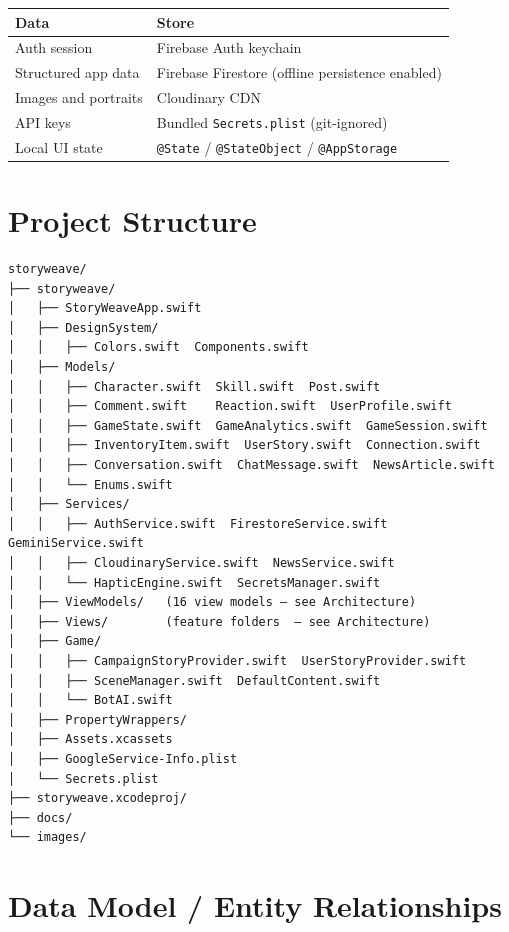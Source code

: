 \documentclass[12pt,a4paper]{article}
\begin{document}
\begin{center}
\begin{tabular}{ll}
  \toprule
  \textbf{Data} & \textbf{Store} \\
  \midrule
  Auth session              & Firebase Auth keychain \\
  Structured app data       & Firebase Firestore (offline persistence enabled) \\
  Images and portraits      & Cloudinary CDN \\
  API keys                  & Bundled \texttt{Secrets.plist} (git-ignored) \\
  Local UI state            & \texttt{@State} / \texttt{@StateObject} / \texttt{@AppStorage} \\
  \bottomrule
\end{tabular}
\end{center}

\section{Project Structure}

{\small
\begin{verbatim}
storyweave/
├── storyweave/
│   ├── StoryWeaveApp.swift
│   ├── DesignSystem/
│   │   ├── Colors.swift  Components.swift
│   ├── Models/
│   │   ├── Character.swift  Skill.swift  Post.swift
│   │   ├── Comment.swift    Reaction.swift  UserProfile.swift
│   │   ├── GameState.swift  GameAnalytics.swift  GameSession.swift
│   │   ├── InventoryItem.swift  UserStory.swift  Connection.swift
│   │   ├── Conversation.swift  ChatMessage.swift  NewsArticle.swift
│   │   └── Enums.swift
│   ├── Services/
│   │   ├── AuthService.swift  FirestoreService.swift  GeminiService.swift
│   │   ├── CloudinaryService.swift  NewsService.swift
│   │   └── HapticEngine.swift  SecretsManager.swift
│   ├── ViewModels/   (16 view models — see Architecture)
│   ├── Views/        (feature folders  — see Architecture)
│   ├── Game/
│   │   ├── CampaignStoryProvider.swift  UserStoryProvider.swift
│   │   ├── SceneManager.swift  DefaultContent.swift
│   │   └── BotAI.swift
│   ├── PropertyWrappers/
│   ├── Assets.xcassets
│   ├── GoogleService-Info.plist
│   └── Secrets.plist
├── storyweave.xcodeproj/
├── docs/
└── images/
\end{verbatim}
}

\section{Data Model / Entity Relationships}
\end{document}
